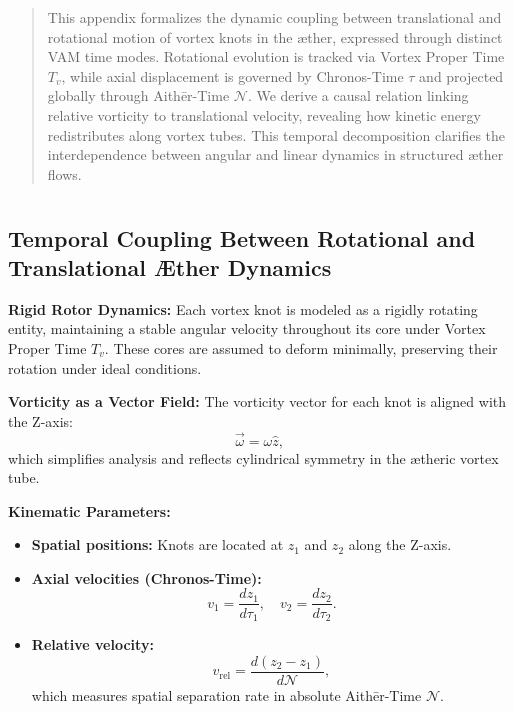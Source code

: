 \documentclass[12pt]{article}
\begin{document}
    \titlepageOpen

    \begin{abstract}
        This appendix formalizes the dynamic coupling between translational and rotational motion of vortex knots in the æther, expressed through distinct VAM time modes. Rotational evolution is tracked via Vortex Proper Time \( T_v \), while axial displacement is governed by Chronos-Time \( \tau \) and projected globally through Aithēr-Time \( \mathcal{N} \). We derive a causal relation linking relative vorticity to translational velocity, revealing how kinetic energy redistributes along vortex tubes. This temporal decomposition clarifies the interdependence between angular and linear dynamics in structured æther flows.
    \end{abstract}


    \titlepageClose
    \fi

    \section{\appendixtitle}

    \subsection*{Temporal Coupling Between Rotational and Translational Æther Dynamics}

    \textbf{Rigid Rotor Dynamics:} Each vortex knot is modeled as a rigidly rotating entity, maintaining a stable angular velocity throughout its core under Vortex Proper Time \( T_v \). These cores are assumed to deform minimally, preserving their rotation under ideal conditions.

    \textbf{Vorticity as a Vector Field:} The vorticity vector for each knot is aligned with the Z-axis:
    \begin{equation*}
        \vec{\omega} = \omega \hat{z},
    \end{equation*}
    which simplifies analysis and reflects cylindrical symmetry in the ætheric vortex tube.

    \textbf{Kinematic Parameters:}
    \begin{itemize}
        \item \textbf{Spatial positions:} Knots are located at \( z_1 \) and \( z_2 \) along the Z-axis.
        \item \textbf{Axial velocities (Chronos-Time):}
        \begin{equation*}
            v_1 = \frac{dz_1}{d\tau_1}, \quad v_2 = \frac{dz_2}{d\tau_2}.
        \end{equation*}
        \item \textbf{Relative velocity:}
        \begin{equation*}
            v_\text{rel} = \frac{d(z_2 - z_1)}{d\mathcal{N}},
        \end{equation*}
        which measures spatial separation rate in absolute Aithēr-Time \( \mathcal{N} \).
    \end{itemize}
\end{document}
